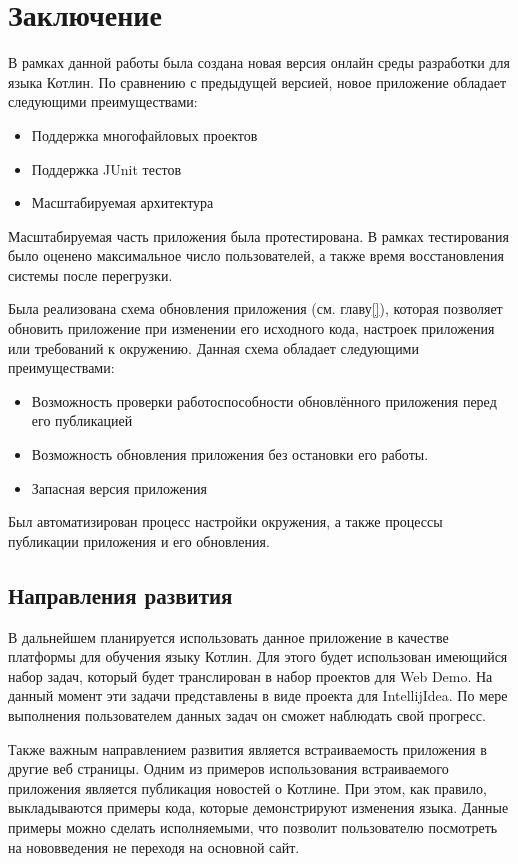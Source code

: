 \chapter*{Заключение}
	В рамках данной работы была создана новая версия онлайн среды разработки для языка Котлин. По сравнению с предыдущей версией, новое приложение обладает следующими преимуществами:
\begin{itemize}
	\item Поддержка многофайловых проектов
	\item Поддержка JUnit тестов
	\item Масштабируемая архитектура
\end{itemize}
	
	Масштабируемая часть приложения была протестирована. В рамках тестирования было оценено максимальное число пользователей, а также время восстановления системы после перегрузки.
	
	Была реализована схема обновления приложения (см. главу\ref{}), которая позволяет обновить приложение при изменении его исходного кода, настроек приложения или требований к окружению. Данная схема обладает следующими преимуществами:
	
\begin{itemize}
	\item Возможность проверки работоспособности обновлённого приложения перед его публикацией
	\item Возможность обновления приложения без остановки его работы.
	\item Запасная версия приложения
\end{itemize}

	Был автоматизирован процесс настройки окружения, а также процессы публикации приложения и его обновления.
	
\section*{Направления развития}

	В дальнейшем планируется использовать данное приложение в качестве платформы для обучения языку Котлин. Для этого будет использован имеющийся набор задач, который будет транслирован в набор проектов для Web Demo. На данный момент эти задачи представлены в виде проекта для IntellijIdea. По мере выполнения пользователем данных задач он сможет наблюдать свой прогресс.
	
	Также важным направлением развития является встраиваемость приложения в другие веб страницы. Одним из примеров использования встраиваемого приложения является публикация новостей о Котлине. При этом, как правило, выкладываются примеры кода, которые демонстрируют изменения языка. Данные примеры можно сделать исполняемыми, что позволит пользователю посмотреть на нововведения не переходя на основной сайт.